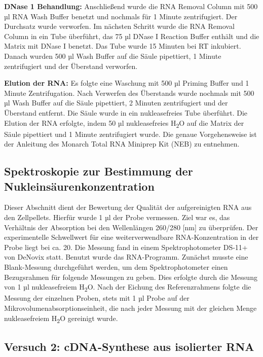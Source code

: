 \documentclass{article}
\begin{document}
\textbf{DNase 1 Behandlung:}
Anschließend wurde die RNA Removal Column mit 500 µl RNA Wash Buffer benetzt und nochmals für 1 Minute zentrifugiert. Der Durchsatz wurde verworfen. Im nächsten Schritt wurde die RNA Removal Column in ein Tube überführt, das 75 µl DNase I Reaction Buffer enthält und die Matrix mit DNase I benetzt. Das Tube wurde 15 Minuten bei RT inkubiert. Danach wurden 500 µl Wash Buffer auf die Säule pipettiert, 1 Minute zentrifugiert und der Überstand verworfen.

\textbf{Elution der RNA:}
Es folgte eine Waschung mit 500 µl Priming Buffer und 1 Minute Zentrifugation. Nach Verwerfen des Überstands wurde nochmals mit 500 µl Wash Buffer auf die Säule pipettiert, 2 Minuten zentrifugiert und der Überstand entfernt. Die Säule wurde in ein nukleasefreies Tube überführt. Die Elution der RNA erfolgte, indem 50 µl nukleasefreies H\textsubscript{2}O auf die Matrix der Säule pipettiert und 1 Minute zentrifugiert wurde. Die genaue Vorgehensweise ist der Anleitung des Monarch\textsuperscript{\textregistered} Total RNA Miniprep Kit (NEB) zu entnehmen.

\subsection*{Spektroskopie zur Bestimmung der Nukleinsäurenkonzentration}

Dieser Abschnitt dient der Bewertung der Qualität der aufgereinigten RNA aus den Zellpellets. Hierfür wurde 1 µl der Probe vermessen. Ziel war es, das Verhältnis der Absorption bei den Wellenlängen 260/280 [nm] zu überprüfen. Der experimentelle Schwellwert für eine weiterverwendbare RNA-Konzentration in der Probe liegt bei ca. 20. Die Messung fand in einem Spektrophotometer DS-11+ von DeNovix statt. Benutzt wurde das RNA-Programm. Zunächst musste eine Blank-Messung durchgeführt werden, um dem Spektrophotometer einen Bezugsrahmen für folgende Messungen zu geben. Dies erfolgte durch die Messung von 1 µl nukleasefreiem H\textsubscript{2}O. Nach der Eichung des Referenzrahmens folgte die Messung der einzelnen Proben, stets mit 1 µl Probe auf der Mikrovolumenabsorptionseinheit, die nach jeder Messung mit der gleichen Menge nukleasefreiem H\textsubscript{2}O gereinigt wurde.

\subsection*{Versuch 2: cDNA-Synthese aus isolierter RNA}
\end{document}
